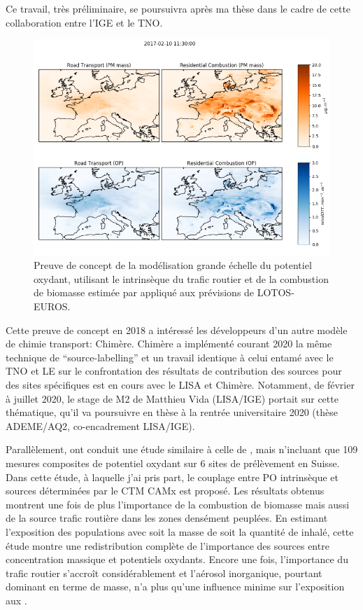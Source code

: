 Ce travail, très préliminaire, se poursuivra après ma thèse dans le cadre de cette
collaboration entre l'IGE et le TNO.

\begin{figure}[ht]
    \centering
    \includegraphics[width=0.8\linewidth]{figures/chapter05/OPmap.png}
    \caption{Preuve de concept de la modélisation grande échelle du potentiel oxydant,
    utilisant le \PODTT{} intrinsèque du trafic routier et de la combustion de biomasse
estimée par \cite{weberSourceinprep.} appliqué aux prévisions de LOTOS-EUROS.}%
    \label{fig:OPmap}
\end{figure}

Cette preuve de concept en 2018 a intéressé les développeurs
d'un autre modèle de chimie transport: Chimère. Chimère a implémenté courant 2020 la
même technique de ``source-labelling'' et un travail identique à celui entamé avec le TNO
et LE sur le confrontation des résultats de contribution des sources pour des sites
spécifiques est en cours avec le LISA et Chimère. Notamment, de février à juillet 2020, le
stage de M2 de Matthieu Vida (LISA/IGE) portait sur cette thématique, qu'il va poursuivre en thèse à
la rentrée universitaire 2020 (thèse ADEME/AQ2, co-encadrement LISA/IGE).

Parallèlement, \cite{daellenbachSourcessubmitted} ont conduit une étude similaire à celle
de \cite{weberSourceinprep.}, mais n'incluant que 109 mesures composites de potentiel
oxydant sur 6 sites de prélèvement en Suisse. Dans cette étude, à laquelle j'ai pris
part, le couplage entre PO intrinsèque et sources déterminées par le CTM CAMx est proposé.
Les résultats obtenus montrent une fois de plus
l'importance de la combustion de biomasse mais aussi de la source trafic routière dans
les zones densément peuplées. En estimant l'exposition des populations avec soit la masse de
\PMdix{} soit la quantité de \POv{} inhalé, cette étude montre une
redistribution complète de l'importance des sources entre concentration massique et
potentiels oxydants. Encore une fois, l'importance du trafic routier s'accroît
considérablement et l'aérosol inorganique, pourtant dominant en terme de masse, n'a plus
qu'une influence minime sur l'exposition aux \POv.


